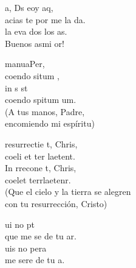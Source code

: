 \documentclass[12pt]{article}
\begin{document}
\begin{multicols*}{2}
\begin{cancion}%
	a, Ds eoy aq,\\
	acias te  por me la da.\\
	la eva dos los as.\\
	Buenos asmi or! \\
\end{cancion}%

\begin{cancion}%
	 manuaPer,\\
	coendo situm ,\\
	in s st \\
	coendo spitum um.\\
(A tus manos, Padre, \\
 encomiendo mi espíritu)\\
\end{cancion}%

\begin{cancion}%
	 resurrectie t, Chris,\\
	coeli et ter laetent.\\
	In rrecone t, Chris,\\
	coelet terrlaetenr.\\
(Que el cielo y la tierra se alegren\\
 con tu resurrección, Cristo)\\
\end{cancion}%

\begin{cancion}%
	ui no pt\\
	que me se de tu ar.\\
	uis no pera\\
	 me sere de tu a.\\
\end{cancion}%


\end{multicols*}
\end{document}
